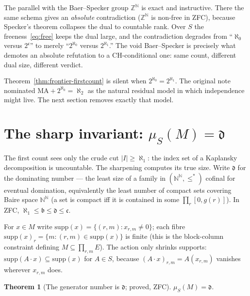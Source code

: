 \documentclass[11pt]{report}
\theoremstyle{plain}
\newtheorem{theorem}{Theorem}[chapter]
\theoremstyle{definition}
\theoremstyle{remark}
\newcommand{\dd}{\mathfrak{d}}
\newcommand{\cont}{\mathfrak{c}}
\newcommand{\supp}{\mathrm{supp}}
\newcommand{\N}{\mathbb{N}}
\newcommand{\Z}{\mathbb{Z}}
\newcommand{\bb}{\mathfrak{b}}
\begin{document}
The parallel with the Baer--Specker group $\Z^\N$ is exact and instructive.
There the same schema gives an \emph{absolute} contradiction ($\Z^\N$ is non-free
in ZFC), because Specker's theorem collapses the dual to countable rank. Over
$S$ the freeness~\eqref{eq:free} keeps the dual large, and the contradiction
degrades from ``$\aleph_0$ versus $2^{\cont}$'' to merely ``$2^{\aleph_0}$
versus $2^{\aleph_1}$.'' The void Baer--Specker is precisely what demotes an
absolute refutation to a CH-conditional one: same count, different dual size,
different verdict.

Theorem~\ref{thm:frontier-firstcount} is silent when $2^{\aleph_0}=2^{\aleph_1}$.
The original note nominated $\mathrm{MA}+2^{\aleph_0}=\aleph_2$ as the natural
residual model in which independence might live. The next section removes exactly
that model.

\section{The sharp invariant: \texorpdfstring{$\mu_S(M)=\dd$}{mu(M)=d}}\label{sec:frontier-sharp}

The first count sees only the crude cut $|I|\ge\aleph_1$: the index set of a
Kaplansky decomposition is uncountable. The sharpening computes its true size.
Write $\dd$ for the dominating number --- the least size of a family in
$(\N^\N,\le^*)$ cofinal for eventual domination, equivalently the least number of
compact sets covering Baire space $\N^\N$ (a set is compact iff it is contained
in some $\prod_r[0,g(r)]$). In ZFC, $\aleph_1\le\bb\le\dd\le\cont$.

For $x\in M$ write $\supp(x)=\{(r,m):x_{r,m}\ne0\}$; each fibre
$\supp(x)_r=\{m:(r,m)\in\supp(x)\}$ is finite (this is the block-column
constraint defining $M\subseteq\prod_{r,m}E$). The action only shrinks supports:
$\supp(A\cdot x)\subseteq\supp(x)$ for $A\in S$, because $(A\cdot
x)_{r,m}=A(x_{r,m})$ vanishes wherever $x_{r,m}$ does.

\begin{theorem}[The generator number is $\dd$; proved, ZFC]\label{thm:frontier-mu}
$\mu_S(M)=\dd$.
\end{theorem}
\end{document}
